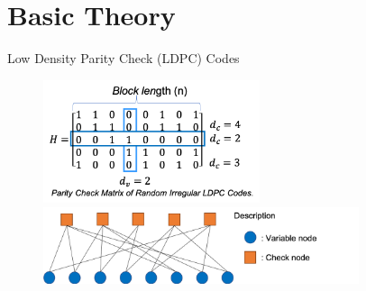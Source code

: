 \documentclass[11pt, aspectratio=169]{beamer}
\begin{document}
\section{Basic Theory}
\begin{frame}{Low Density Parity Check (LDPC) Codes}
\vspace{-0.2 cm}
	\begin{figure}
		\centering
		\vspace{-0.25cm}
		\begin{minipage}{.5\linewidth}
			\hspace{-0.25cm}
			\includegraphics[width=2.5in]{PEG/matrixirre.png}
			\vspace{-0.5cm}
			
		\end{minipage}
		\hfill 	
		\hspace{ -1in}
		\begin{minipage}{.5\linewidth}
			\hspace{0.75cm}
			\includegraphics[width=3.65in]{PEG/TannerH}
			

\end{minipage}
\end{figure}
\end{frame}
\end{document}
